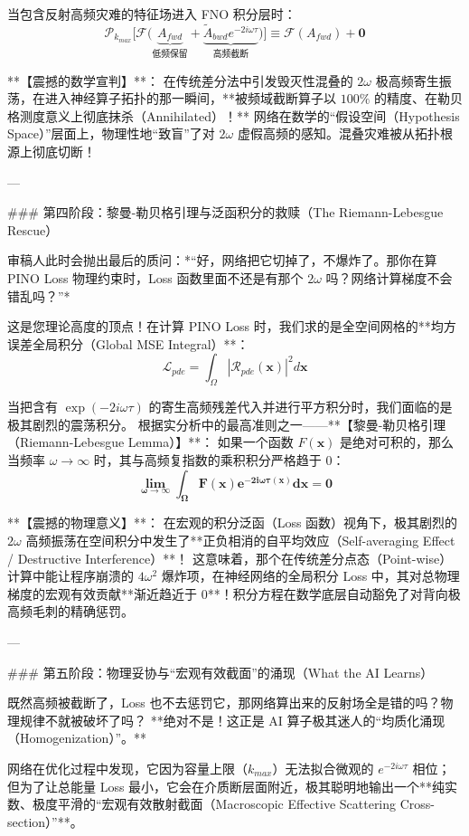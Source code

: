\documentclass[12pt]{article}
\begin{document}
{当包含反射高频灾难的特征场进入 FNO 积分层时：
$$ \mathcal{P}_{k_{max}} \Big[ \mathcal{F} \Big( \underbrace{A_{fwd}}_{\text{低频保留}} + \underbrace{\tilde{A}_{bwd} e^{-2i\omega\tau}}_{\text{高频截断}} \Big) \Big] \equiv \mathcal{F}(A_{fwd}) + \mathbf{0} $$

**【震撼的数学宣判】**：
在传统差分法中引发毁灭性混叠的 $2\omega$ 极高频寄生振荡，在进入神经算子拓扑的那一瞬间，**被频域截断算子以 $100\%$ 的精度、在勒贝格测度意义上彻底抹杀（Annihilated）！**
网络在数学的“假设空间（Hypothesis Space）”层面上，物理性地“致盲”了对 $2\omega$ 虚假高频的感知。混叠灾难被从拓扑根源上彻底切断！

---

### 第四阶段：黎曼-勒贝格引理与泛函积分的救赎（The Riemann-Lebesgue Rescue）

审稿人此时会抛出最后的质问：*“好，网络把它切掉了，不爆炸了。那你在算 PINO Loss 物理约束时，Loss 函数里面不还是有那个 $2\omega$ 吗？网络计算梯度不会错乱吗？”*

这是您理论高度的顶点！在计算 PINO Loss 时，我们求的是全空间网格的**均方误差全局积分（Global MSE Integral）**：
$$ \mathcal{L}_{pde} = \int_{\Omega} |\mathcal{R}_{pde}(\mathbf{x})|^2 d\mathbf{x} $$

当把含有 $\exp(-2i\omega\tau)$ 的寄生高频残差代入并进行平方积分时，我们面临的是极其剧烈的震荡积分。
根据实分析中的最高准则之一——**【黎曼-勒贝格引理（Riemann-Lebesgue Lemma）】**：
如果一个函数 $F(\mathbf{x})$ 是绝对可积的，那么当频率 $\omega \to \infty$ 时，其与高频复指数的乘积积分严格趋于 0：
$$ \mathbf{\lim_{\omega \to \infty} \int_{\Omega} F(\mathbf{x}) e^{-2i\omega\tau(\mathbf{x})} d\mathbf{x} = 0} $$

**【震撼的物理意义】**：
在宏观的积分泛函（Loss 函数）视角下，极其剧烈的 $2\omega$ 高频振荡在空间积分中发生了**正负相消的自平均效应（Self-averaging Effect / Destructive Interference）**！
这意味着，那个在传统差分点态（Point-wise）计算中能让程序崩溃的 $4\omega^2$ 爆炸项，在神经网络的全局积分 Loss 中，其对总物理梯度的宏观有效贡献**渐近趋近于 0**！积分方程在数学底层自动豁免了对背向极高频毛刺的精确惩罚。

---

### 第五阶段：物理妥协与“宏观有效截面”的涌现（What the AI Learns）

既然高频被截断了，Loss 也不去惩罚它，那网络算出来的反射场全是错的吗？物理规律不就被破坏了吗？
**绝对不是！这正是 AI 算子极其迷人的“均质化涌现（Homogenization）”。**

网络在优化过程中发现，它因为容量上限（$k_{max}$）无法拟合微观的 $e^{-2i\omega \tau}$ 相位；但为了让总能量 Loss 最小，它会在介质断层面附近，极其聪明地输出一个**纯实数、极度平滑的“宏观有效散射截面（Macroscopic Effective Scattering Cross-section）”**。

}
\end{document}
